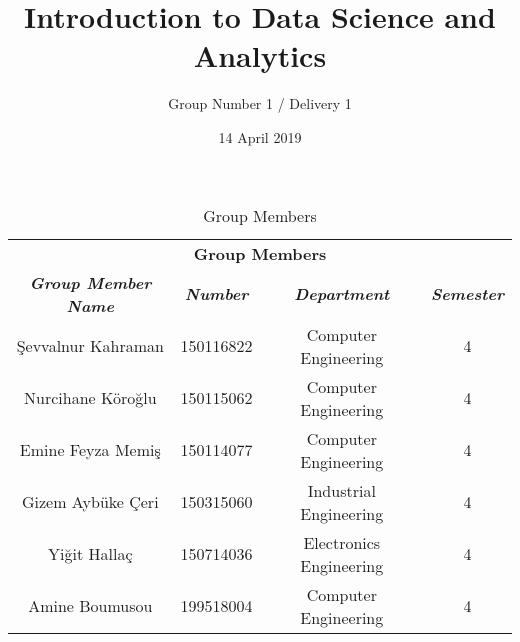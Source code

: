 \documentclass{article}
\title{Introduction to Data Science and Analytics}
\author{Group Number 1 / Delivery 1}
\date{14 April 2019}
\begin{document}
\maketitle


\begin{table}[htbp]
\caption{Group Members}
\begin{center}
\begin{tabular}{|c|c|c|c|}
\hline
\multicolumn{4}{|c|}{\textbf{Group Members}} \\
\cline{1-4} 
\textbf{\textit{Group Member Name}}&
\textbf{\textit{Number}}&
\textbf{\textit{Department}}&
\textbf{\textit{Semester}} \\
\hline
Şevvalnur Kahraman & 150116822 & Computer Engineering & 4 \\
\hline
Nurcihane Köroğlu & 150115062 & Computer Engineering & 4 \\
\hline
Emine Feyza Memiş & 150114077 & Computer Engineering & 4 \\
\hline
Gizem Aybüke Çeri & 150315060 & Industrial Engineering & 4 \\
\hline
Yiğit Hallaç & 150714036 & Electronics Engineering & 4 \\
\hline
Amine Boumusou & 199518004 & Computer Engineering & 4 \\
\hline
\end{tabular}
\label{tab1}
\end{center}
\end{table}
\end{document}
